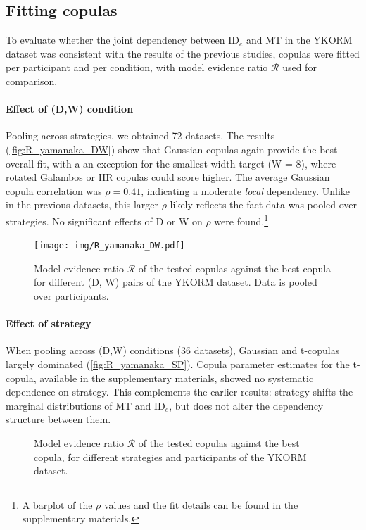 \documentclass[acmlarge, manuscript,review]{acmart}
\newcommand{\ide}{\ensuremath{{\text{ID}_e}}\xspace}
\begin{document}
\subsection{Fitting copulas}
To evaluate whether the joint dependency between \ide and MT in the YKORM dataset was consistent with the results of the previous studies, copulas were fitted per participant and per condition, with model evidence ratio $\mathcal{R}$ used for comparison.

\paragraph{Effect of (D,W) condition}
Pooling across strategies, we obtained 72 datasets. The results (\autoref{fig:R_yamanaka_DW}) show that Gaussian copulas again provide the best overall fit, with a an exception for the smallest width target (W = 8), where rotated Galambos or HR copulas could score higher. The average Gaussian copula correlation was $\rho = 0.41$, indicating a moderate \textit{local} dependency. Unlike in the previous datasets, this larger $\rho$ likely reflects the fact data was pooled over strategies. No significant effects of D or W on $\rho$ were found.\footnote{A barplot of the $\rho$ values and the fit details can be found in the supplementary materials.}


\begin{figure}[htbp]
	\centering
	\texttt{[image: img/R\_yamanaka\_DW.pdf]}
	\caption{Model evidence ratio $\mathcal{R}$ of the tested copulas against the best copula for different (D, W) pairs of the YKORM dataset. Data is pooled over participants.}
	\label{fig:R_yamanaka_DW}
\end{figure}


\paragraph{Effect of strategy}
When pooling across (D,W) conditions (36 datasets), Gaussian and t-copulas largely dominated (\autoref{fig:R_yamanaka_SP}). Copula parameter estimates for the t-copula, available in the supplementary materials, showed no systematic dependence on strategy. This complements the earlier results: strategy shifts the marginal distributions of MT and \ide, but does not alter the dependency structure between them.



\begin{figure}[htbp]
	\centering
	\caption{Model evidence ratio $\mathcal{R}$ of the tested copulas against the best copula, for different strategies and participants of the YKORM dataset.}
	\label{fig:R_yamanaka_SP}
\end{figure}
\end{document}
